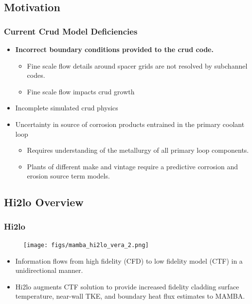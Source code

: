 \documentclass[t, pdftex]{beamer}
\begin{document}
\subsection*{Motivation}
\begin{frame}
\frametitle{Current Crud Model Deficiencies}
\begin{itemize}
    \item \textbf{Incorrect boundary conditions provided to the crud code.}
    \begin{itemize}
        \item Fine scale flow details around spacer grids are not resolved by subchannel codes. 
        \item Fine scale flow impacts crud growth
    \end{itemize}
    \item Incomplete simulated crud physics
    \item Uncertainty in source of corrosion products entrained in the primary coolant loop
    \begin{itemize}
        \item Requires understanding of the metallurgy of all primary loop components. 
        \item Plants of different make and vintage require a predictive corrosion and erosion source term models.
    \end{itemize}
\end{itemize}
\end{frame}


\subsection*{Hi2lo Overview}
\begin{frame}
\frametitle{Hi2lo}
\begin{figure}[]
    \vspace{-16.5pt}
    \centering
    \texttt{[image: figs/mamba\_hi2lo\_vera\_2.png]}
    \label{hi2lo_overview}
\end{figure}
\vspace{-16.5pt}
\begin{itemize}
    \item Information flows from high fidelity (CFD) to low fidelity model (CTF) in a unidirectional manner.
    \item Hi2lo augments CTF solution to provide increased fidelity cladding surface temperature, near-wall TKE, and boundary heat flux estimates to MAMBA.
\end{itemize}
\end{frame}
\end{document}
